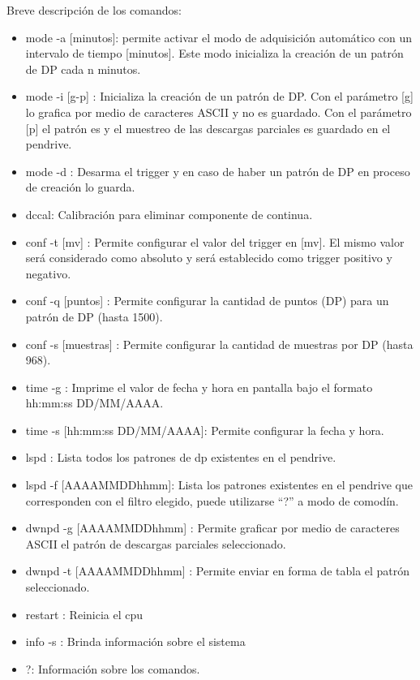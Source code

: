 Breve descripción de los comandos:
\begin{itemize}
\item mode -a [minutos]: permite activar el modo de adquisición automático con un intervalo de tiempo [minutos]. Este modo inicializa la creación de un patrón de DP cada n minutos.
\item mode -i [g-p] : Inicializa la creación de un patrón de DP. Con el parámetro [g] lo grafica por medio de caracteres ASCII y no es guardado. Con el parámetro [p] el patrón es y el muestreo de las descargas parciales es guardado en el pendrive.
\item mode -d : Desarma el trigger y en caso de haber un patrón de DP en proceso de creación lo guarda.
\item dccal: Calibración para eliminar componente de continua.
\item conf -t [mv] : Permite configurar el valor del trigger en [mv]. El mismo valor será considerado como absoluto y será establecido como trigger positivo y negativo.
\item conf -q [puntos] : Permite configurar la cantidad de puntos (DP) para un patrón de DP (hasta 1500). 
\item conf -s [muestras] : Permite configurar la cantidad de muestras por DP (hasta 968).
\item time -g : Imprime el valor de fecha y hora en pantalla bajo el formato hh:mm:ss DD/MM/AAAA.
\item time -s [hh:mm:ss DD/MM/AAAA]: Permite configurar la fecha y hora.
\item lspd : Lista todos los patrones de dp existentes en el pendrive.
\item lspd -f [AAAAMMDDhhmm]: Lista los patrones existentes en el pendrive que corresponden con el filtro elegido, puede utilizarse “?” a modo de comodín.
\item dwnpd -g [AAAAMMDDhhmm] : Permite graficar por medio de caracteres ASCII el patrón de descargas parciales seleccionado.
\item dwnpd -t [AAAAMMDDhhmm] : Permite enviar en forma de tabla el patrón seleccionado.
\item restart : Reinicia el cpu
\item info -s : Brinda información sobre el sistema
\item ?: Información sobre los comandos.
\end{itemize}

\vspace{5mm}

